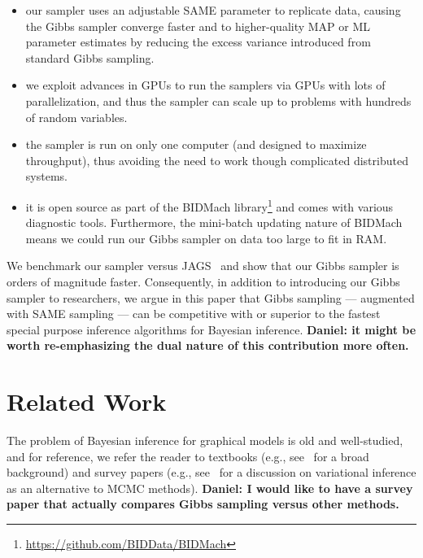\documentclass{article} %
\begin{document}
\begin{itemize}[noitemsep]
    \item our sampler uses an adjustable SAME parameter to replicate data, causing the Gibbs
    sampler converge faster and to higher-quality MAP or ML parameter estimates by reducing the
    excess variance introduced from standard Gibbs sampling.
    \item we exploit advances in GPUs to run the samplers via GPUs with lots of parallelization, and
    thus the sampler can scale up to problems with hundreds of random variables.
    \item the sampler is run on only one computer (and designed to maximize throughput), thus
    avoiding the need to work though complicated distributed systems.
    \item it is open source as part of the BIDMach
    library\footnote{\url{https://github.com/BIDData/BIDMach}} and comes with various diagnostic
    tools. Furthermore, the mini-batch updating nature of BIDMach means we could run our Gibbs
    sampler on data too large to fit in RAM.
\end{itemize}

We benchmark our sampler versus JAGS~\citep{JAGS2003} and show that our Gibbs sampler is orders of
magnitude faster. Consequently, in addition to introducing our Gibbs sampler to researchers, we
argue in this paper that Gibbs sampling --- augmented with SAME sampling --- can be competitive with
or superior to the fastest special purpose inference algorithms for Bayesian inference.
\textbf{Daniel: it might be worth re-emphasizing the dual nature of this contribution more often.}





\section{Related Work}\label{sec:related_work}

The problem of Bayesian inference for graphical models is old and well-studied, and for reference,
we refer the reader to textbooks (e.g., see~\citet{Koller2009} for a broad background) and survey
papers (e.g., see~\citet{Wainwright2008} for a discussion on variational inference as an alternative
to MCMC methods). \textbf{Daniel: I would like to have a survey paper that actually compares Gibbs
sampling versus other methods.}
\end{document}
